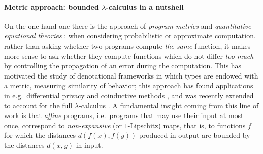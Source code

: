 


\paragraph*{Metric approach: bounded $\lambda$-calculus in a nutshell}

On the one hand one there is the approach of \emph{program metrics} \cite{Reed2010, Gaboardi2017, Gabo2019} and \emph{quantitative equational theories} \cite{Plotk}: when considering probabilistic or approximate computation, rather than asking whether two programs compute \emph{the same} function, it makes more sense to ask whether they compute functions which do not differ \emph{too much} by controlling the propagation of an error during the computation.
This has motivated the study of denotational frameworks in which types are endowed with a metric, measuring similarity of behavior; this approach has found  applications in e.g.~differential privacy \cite{Reed2010} and coinductive methods \cite{Bonchi2018}, and was recently extended to account for the full $\lambda$-calculus \cite{Geoffroy2020, PistoneLICS, PistoneFSCD2022}.
A fundamental insight coming from this line of work is that \emph{affine} programs, i.e.~programs that may use their input at most once, correspond to \emph{non-expansive} (or $1$-Lipschitz) maps, that is, to functions $f$ for which the distances
$d(f(x),f(y))$ produced in output are bounded by the distances $d(x,y)$ in input. 
